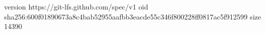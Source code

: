 version https://git-lfs.github.com/spec/v1
oid sha256:600f01890673a8c4bab52955aafbb3eacde55c346f800228ff0817ac5f912599
size 14390
